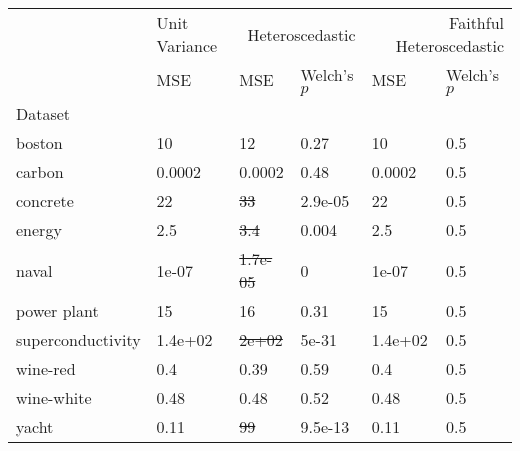 \begin{tabular}{l|l|ll|ll}
\toprule
 & Unit Variance & \multicolumn{2}{r}{Heteroscedastic} & \multicolumn{2}{r}{Faithful Heteroscedastic} \\
 & MSE & MSE & Welch's $p$ & MSE & Welch's $p$ \\
Dataset &  &  &  &  &  \\
\midrule
boston & 10 & 12 & 0.27 & 10 & 0.5 \\
carbon & 0.0002 & 0.0002 & 0.48 & 0.0002 & 0.5 \\
concrete & 22 & \sout{33} & 2.9e-05 & 22 & 0.5 \\
energy & 2.5 & \sout{3.4} & 0.004 & 2.5 & 0.5 \\
naval & 1e-07 & \sout{1.7e-05} & 0 & 1e-07 & 0.5 \\
power plant & 15 & 16 & 0.31 & 15 & 0.5 \\
superconductivity & 1.4e+02 & \sout{2e+02} & 5e-31 & 1.4e+02 & 0.5 \\
wine-red & 0.4 & 0.39 & 0.59 & 0.4 & 0.5 \\
wine-white & 0.48 & 0.48 & 0.52 & 0.48 & 0.5 \\
yacht & 0.11 & \sout{99} & 9.5e-13 & 0.11 & 0.5 \\
\bottomrule
\end{tabular}
